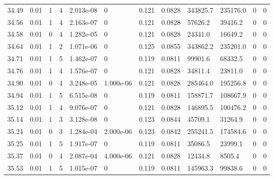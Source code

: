 \documentclass[preview]{standalone}
\begin{document}
{{{{{{{{{\begin{tabular}{L{1.2cm}C{1.2cm} C{0.3cm}C{0.5cm} C{1.4cm}C{1.4cm} C{1.4cm}C{1.4cm} C{1.6cm}C{1.6cm} C{1.6cm}C{1.6cm}}
  34.49  &  0.01  & 1     &  4 &  2.013e-08  & 0  &  0.121&   0.0828& 343825.7 & 235176.0   &  0 & 0  \\ 
  34.56  &  0.01  & 1     &  4 &  2.163e-07  & 0  &  0.121&   0.0828& 57626.2 & 39416.2   &  0 & 0  \\ 
  34.58  &  0.01  & 0     &  4 &  1.282e-05  & 0  &  0.121&   0.0828& 24341.0 & 16649.2   &  0 & 0  \\ 
  34.64  &  0.01  & 1     &  2 &  1.071e-06  & 0  &  0.125&   0.0855& 343862.2 & 235201.0   &  0 & 0  \\ 
  34.71  &  0.01  & 1     &  5 &  1.462e-07  & 0  &  0.119&   0.0811& 99901.6 & 68332.5   &  0 & 0  \\ 
  34.76  &  0.01  & 1     &  4 &  1.576e-07  & 0  &  0.121&   0.0828& 34811.4 & 23811.0   &  0 & 0  \\ 
  34.90  &  0.01  & 0     &  4 &  3.248e-05  & 1.000e-06  &  0.121&   0.0828& 285464.0 & 195256.8   &  0 & 0  \\ 
  34.94  &  0.01  & 1     &  5 &  6.515e-08  & 0  &  0.119&   0.0811& 158871.7 & 108667.9   &  0 & 0  \\ 
  35.12  &  0.01  & 1     &  4 &  9.076e-07  & 0  &  0.121&   0.0828& 146895.5 & 100476.2   &  0 & 0  \\ 
  35.14  &  0.01  & 1     &  3 &  3.128e-08  & 0  &  0.123&   0.0844& 45709.1 & 31264.9   &  0 & 0  \\ 
  35.24  &  0.01  & 0     &  3 &  1.284e-04  & 2.000e-06  &  0.123&   0.0842& 255241.5 & 174584.6   &  0 & 0  \\ 
  35.25  &  0.01  & 1     &  5 &  1.917e-07  & 0  &  0.119&   0.0811& 35086.5 & 23999.1   &  0 & 0  \\ 
  35.37  &  0.01  & 0     &  4 &  2.087e-04  & 4.000e-06  &  0.121&   0.0828& 12434.8 & 8505.4   &  0 & 0  \\ 
  35.53  &  0.01  & 1     &  5 &  1.015e-07  & 0  &  0.119&   0.0811& 145963.3 & 99838.6   &  0 & 0  \\ 
\hline 
\end{tabular} 

}}}}}}}}}
\end{document}
